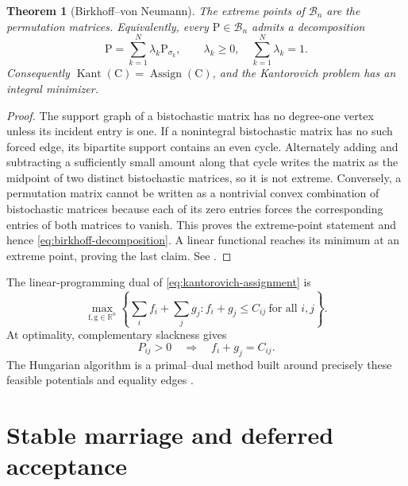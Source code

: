 \documentclass[11pt]{article}
\newtheorem{theorem}{Theorem}[section]
\theoremstyle{definition}
\theoremstyle{remark}
\newcommand{\R}{\mathbb R}
\newcommand{\Pmat}{\mathrm P}
\newcommand{\Cmat}{\mathrm C}
\newcommand{\fD}{\mathrm f}
\newcommand{\gD}{\mathrm g}
\newcommand{\Bcal}{\mathcal B}
\begin{document}
\begin{theorem}[Birkhoff--von Neumann]\label{thm:birkhoff}
The extreme points of $\Bcal_n$ are the permutation matrices. Equivalently,
every $\Pmat\in\Bcal_n$ admits a decomposition
\begin{equation}\label{eq:birkhoff-decomposition}
  \Pmat=\sum_{k=1}^N\lambda_k\Pmat_{\sigma_k},
  \qquad \lambda_k\geq0,\quad \sum_{k=1}^N\lambda_k=1.
\end{equation}
Consequently $\operatorname{Kant}(\Cmat)=\operatorname{Assign}(\Cmat)$,
and the Kantorovich problem has an integral minimizer.
\end{theorem}

\begin{proof}
The support graph of a bistochastic matrix has no degree-one vertex unless its
incident entry is one. If a nonintegral bistochastic matrix has no such forced
edge, its bipartite support contains an even cycle. Alternately adding and
subtracting a sufficiently small amount along that cycle writes the matrix as
the midpoint of two distinct bistochastic matrices, so it is not extreme.
Conversely, a permutation matrix cannot be written as a nontrivial convex
combination of bistochastic matrices because each of its zero entries forces
the corresponding entries of both matrices to vanish. This proves the
extreme-point statement and hence \eqref{eq:birkhoff-decomposition}. A linear
functional reaches its minimum at an extreme point, proving the last claim.
See \citet{Birkhoff1946,VonNeumann1953}.
\end{proof}

The linear-programming dual of \eqref{eq:kantorovich-assignment} is
\begin{equation}\label{eq:kantorovich-dual}
  \max_{\fD,\gD\in\R^n}
  \left\{\sum_i f_i+\sum_j g_j:
  f_i+g_j\leq C_{ij}\ \text{for all }i,j\right\}.
\end{equation}
At optimality, complementary slackness gives
\begin{equation}\label{eq:complementary-slackness-cost}
  P_{ij}>0\quad\Longrightarrow\quad f_i+g_j=C_{ij}.
\end{equation}
The Hungarian algorithm is a primal--dual method built around precisely these
feasible potentials and equality edges \citep{Kuhn1955}.

\section{Stable marriage and deferred acceptance}
\label{sec:stable-marriage}
\end{document}
